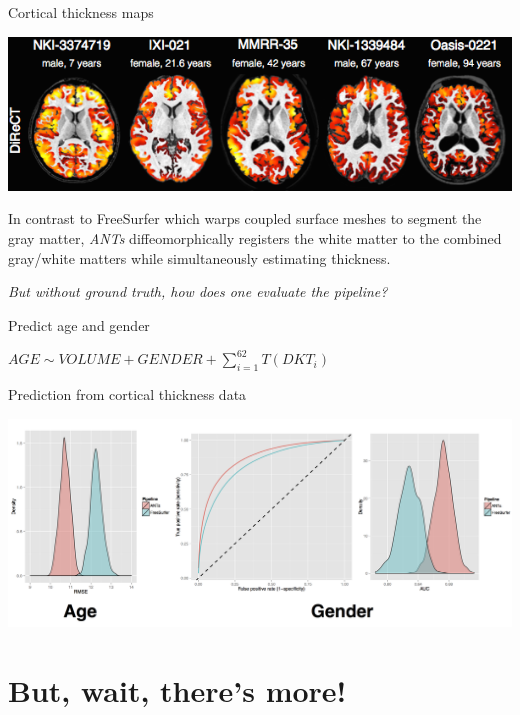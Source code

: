 \documentclass[ignorenonframetext,]{beamer}
\begin{document}
\begin{frame}{Cortical thickness maps}

\includegraphics{./evaluation/figures/corticalThicknessEstimation.png}

In contrast to FreeSurfer which warps coupled surface meshes to segment
the gray matter, \emph{ANTs} diffeomorphically registers the white
matter to the combined gray/white matters while simultaneously
estimating thickness.

\end{frame}

\begin{frame}

\emph{But without ground truth, how does one evaluate the pipeline?}

\end{frame}

\begin{frame}{Predict age and gender}

\(AGE \sim VOLUME + GENDER + \sum_{i=1}^{62} T(DKT_i)\)

\end{frame}

\begin{frame}{Prediction from cortical thickness data}

\includegraphics{./evaluation/figures/evaluation.png}

\end{frame}

\section{But, wait, there's more!}\label{but-wait-theres-more}
\end{document}
